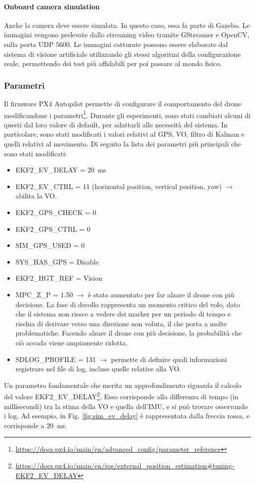  \paragraph{Onboard camera simulation} Anche la camera deve essere simulata. In questo caso, essa fa parte di Gazebo. Le immagini vengono prelevate dallo streaming video tramite GStreamer e OpenCV, sulla porta UDP 5600. Le immagini catturate possono essere elaborate dal sistema di visione artificiale utilizzando gli stessi algoritmi della configurazione reale, permettendo dei test più affidabili per poi passare al mondo fisico.
\subsubsection{Parametri}
Il firmware PX4 Autopilot permette di configurare il comportamento del drone modificandone i parametri\footnote{\url{https://docs.px4.io/main/en/advanced_config/parameter_reference}}. Durante gli esperimenti, sono stati cambiati alcuni di questi dal loro valore di default, per adattarli alle necessità del sistema. In particolare, sono stati modificati i valori relativi al GPS, VO, filtro di Kalman e quelli relativi al movimento. Di seguito la lista dei parametri più principali che sono stati modificati:
\begin{itemize}
	\item EKF2\_EV\_DELAY = \SI{20}{\milli\second}
	\item EKF2\_EV\_CTRL = 11 (horizontal position, vertical position, yaw) $\rightarrow$ abilita la VO.
	\item EKF2\_GPS\_CHECK = 0
	\item EKF2\_GPS\_CTRL = 0
	\item SIM\_GPS\_USED = 0
	\item SYS\_HAS\_GPS = Disable
	\item EKF2\_HGT\_REF = Vision
	\item MPC\_Z\_P = 1.50 $\rightarrow$ è stato aumentato per far alzare il drone con più decisione. La fase di decollo rappresenta un momento critico del volo, dato che il sistema non riesce a vedere dei marker per un periodo di tempo e rischia di derivare verso una direzione non voluta, il che porta a molte problematiche. Facendo alzare il drone con più decisione, la probabilità che ciò accada viene ampiamente ridotta.
	\item SDLOG\_PROFILE = 131 $\rightarrow$ permette di definire quali informazioni registrare nel file di log, incluse quelle relative alla VO.
\end{itemize} 
Un parametro fondamentale che merita un approfondimento riguarda il calcolo del valore EKF2\_EV\_DELAY\footnote{\url{https://docs.px4.io/main/en/ros/external_position_estimation\#tuning-EKF2_EV_DELAY}}. Esso corrisponde alla differenza di tempo (in millisecondi) tra la stima della VO e quella dell'IMU, e si può trovare osservando i log. Ad esempio, in Fig. \ref{fig:sim_ev_delay} è rappresentata dalla freccia rossa, e corrisponde a \SI{20}{\milli\second}.

